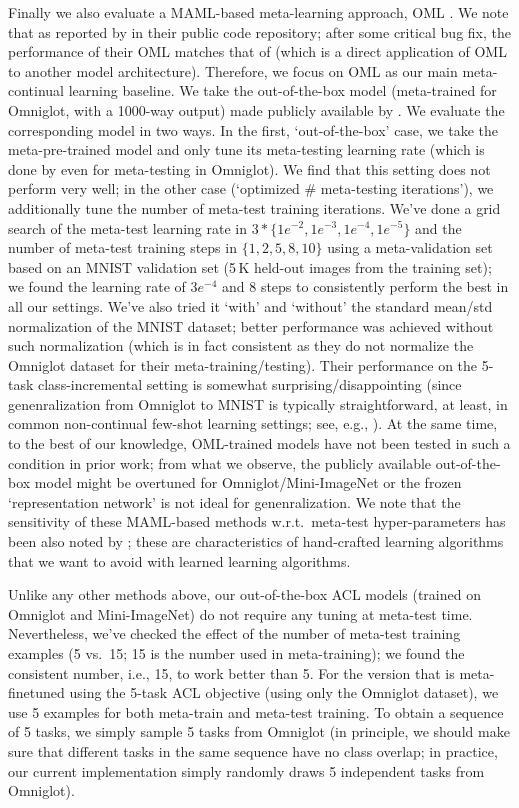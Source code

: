 \documentclass{article}
\begin{document}
Finally we also evaluate a MAML-based meta-learning approach, OML \citep{JavedW19}.
We note that as reported by \citet{JavedW19} in their public code repository; after some critical bug fix, the performance of their OML matches that of \citet{BeaulieuFMLSCC20} (which is a direct application of OML to another model architecture).
Therefore, we focus on OML as our main meta-continual learning baseline.
We take the out-of-the-box model (meta-trained for Omniglot, with a 1000-way output) made publicly available by \citep{JavedW19}.
We evaluate the corresponding model in two ways.
In the first, `out-of-the-box' case, we take the meta-pre-trained model and only tune its meta-testing learning rate (which is done by \citet{JavedW19} even for meta-testing in Omniglot).
We find that this setting does not perform very well;
in the other case (`optimized \# meta-testing iterations'), we additionally tune the number of meta-test training iterations.
We've done a grid search of the meta-test learning rate in $3 * \{1e^{-2}, 1e^{-3}, 1e^{-4}, 1e^{-5}\}$ and the number of meta-test training steps in $\{1, 2, 5, 8, 10\}$ using a meta-validation set based on an MNIST validation set (5\,K held-out images from the training set);
we found the learning rate of $3e^{-4}$ and $8$ steps to consistently perform the best in all our settings.
We've also tried it `with' and `without' the standard mean/std normalization of the MNIST dataset; better performance was achieved without such normalization (which is in fact consistent as they do not normalize the Omniglot dataset for their meta-training/testing).
Their performance on the 5-task class-incremental setting is somewhat surprising/disappointing (since genenralization from Omniglot to MNIST is typically straightforward, at least, in common non-continual few-shot learning settings; see, e.g., \citet{munkhdalai2017meta}). At the same time, to the best of our knowledge, OML-trained models have not been tested in such a condition in prior work; from what we observe, the publicly available out-of-the-box model might be overtuned for Omniglot/Mini-ImageNet or the frozen `representation network' is not ideal for genenralization.
We note that the sensitivity of these MAML-based methods \citep{JavedW19,BeaulieuFMLSCC20} w.r.t.~meta-test hyper-parameters has been also noted by \citet{BanayeeanzadeMH21}; these are characteristics of hand-crafted learning algorithms that we want to avoid with learned learning algorithms.


Unlike any other methods above, our out-of-the-box ACL models (trained on Omniglot and Mini-ImageNet) do not require any tuning at meta-test time.
Nevertheless, we've checked the effect of the number of meta-test training examples (5 vs.~15; 15 is the number used in meta-training); we found the consistent number, i.e., 15, to work better than 5.
For the version that is meta-finetuned using the 5-task ACL objective (using only the Omniglot dataset), we use 5 examples for both meta-train and meta-test training.
To obtain a sequence of 5 tasks, we simply sample 5 tasks from Omniglot (in principle, we should make sure that different tasks in the same sequence have no class overlap; in practice, our current implementation simply randomly draws 5 independent tasks from Omniglot).
\end{document}
